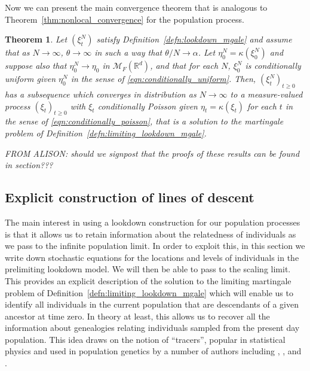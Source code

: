 \documentclass[12pt]{article}
\newtheorem{theorem}{Theorem}[section]
\newcommand{\IR}{\mathbb R}
\newcommand{\lp}{\xi}              %
\newcommand{\measures}{\mathcal{M}_F(\IR^d)} %
\newcommand{\comment}[1]{{\color{blue} \it #1}}
\numberwithin{equation}{section}
\begin{document}
Now we can present the main convergence theorem that is analogous
to Theorem~\ref{thm:nonlocal_convergence} for the population process.

\begin{theorem}
    \label{thm:lookdown_convergence}
    Let $(\lp_t^N)$ satisfy Definition~\ref{defn:lookdown_mgale}
    and assume that as $N \to \infty$,
    $\theta \to \infty$ in such a way that $\theta/N \to \alpha$.
    Let $\eta_0^N = \kappa(\lp_0^N)$ and
    suppose also that $\eta^N_0 \to \eta_0$ in $\measures$,
    and that for each $N$, $\lp^N_0$ is conditionally uniform given $\eta_0^N$
    in the sense of \eqref{eqn:conditionally_uniform}.
    Then, $(\lp_t^N)_{t \ge 0}$ has a subsequence which converges in distribution as $N \to \infty$
    to a measure-valued process $(\lp_t)_{t \ge 0}$
    with $\lp_t$ conditionally Poisson given $\eta_t = \kappa(\lp_t)$ for each $t$
    in the sense of \eqref{eqn:conditionally_poisson},
    that is a solution to the martingale problem of Definition~\ref{defn:limiting_lookdown_mgale}.
\end{theorem}

\comment{FROM ALISON: should we signpost that the proofs of these results can 
be found in section???}

\subsection{Explicit construction of lines of descent}
    \label{sec: individual lines of descent}

 
The main interest in using a lookdown construction for our population
processes is that it allows us to retain information about the 
relatedness of individuals as we pass to the infinite population limit.
In order to exploit this, in this section we write down stochastic 
equations for the locations and levels of individuals in the prelimiting lookdown model.
We will then be able to pass to the scaling limit.
This provides an explicit description of the solution to
the limiting martingale problem of Definition~\ref{defn:limiting_lookdown_mgale}
which will enable us to identify all 
individuals in the current population that are descendants of a
given ancestor at time zero. In theory at least, this allows us to
recover all the information about genealogies relating individuals 
sampled from the present day population. This idea draws on the notion
of ``tracers'', popular in statistical physics and used in population
genetics by a number of authors including 
\citet{hallatschek/nelson:2008}, \citet{durrett/fan:2016}, and \citet{biswas/etheridge/klimek:2018}.
\end{document}
